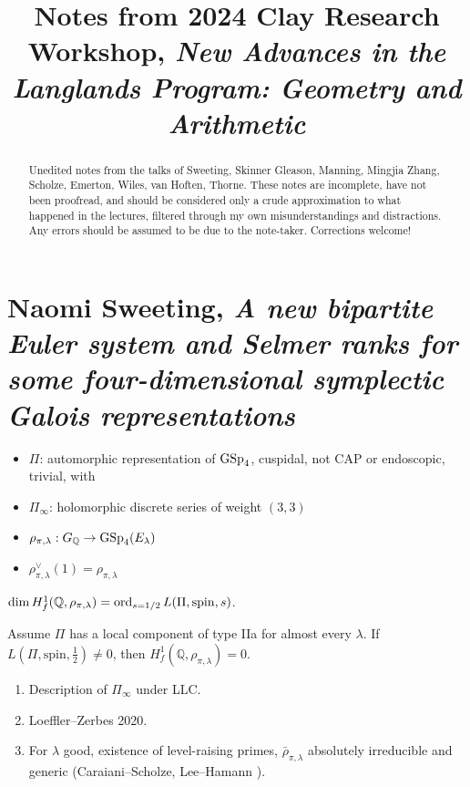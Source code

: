 \documentclass[reqno]{amsart} 
\begin{document}
\title{Notes from 2024 Clay Research Workshop, \emph{New Advances in the Langlands Program: Geometry and Arithmetic}}

\begin{abstract}
  Unedited notes from the talks of Sweeting, Skinner Gleason, Manning, Mingjia Zhang, Scholze, Emerton, Wiles, van Hoften, Thorne.  These notes are incomplete, have not been proofread, and should be considered only a crude approximation to what happened in the lectures, filtered through my own misunderstandings and distractions.  Any errors should be assumed to be due to the note-taker.  Corrections welcome!
\end{abstract}

\maketitle

\tableofcontents

\part{Naomi Sweeting, \emph{A new bipartite Euler system and Selmer ranks for some four-dimensional symplectic Galois representations}}

\begin{itemize}
\item $\Pi$: automorphic representation of $\operatorname{GSp}_{4}$, cuspidal, not CAP or endoscopic, trivial, with 
\item $\Pi_\infty$: holomorphic discrete series of weight $(3,3)$
\item $\rho_{\pi, \lambda} : G_{\mathbb{Q}} \rightarrow \operatorname{GSp}_4(E_\lambda)$
\item $\rho_{\pi, \lambda}^\vee(1) = \rho_{\pi, \lambda}$
\end{itemize}
\begin{conjecture}
  $\dim H_f^1(\mathbb{Q}, \rho_{\pi, \lambda}) = \operatorname{ord}_{s = 1/2} L(\Pi, \mathrm{spin}, s)$.
\end{conjecture}
\begin{theorem}[S.,\ TBD]\label{theorem:cnpoolw6ih}
  Assume $\Pi$ has a local component of type IIa for almost every $\lambda$.  If $L(\Pi, \mathrm{spin}, \tfrac{1}{2}) \neq 0$, then $H_f^1(\mathbb{Q}, \rho_{\pi, \lambda}) = 0$.
\end{theorem}

\begin{remark}
  \begin{enumerate}
  \item Description of $\Pi_\infty$ under LLC.
  \item Loeffler--Zerbes 2020.
  \item For $\lambda$ good, existence of level-raising primes, $\bar{\rho}_{\pi, \lambda}$ absolutely irreducible and generic (Caraiani--Scholze, Lee--Hamann \cite{2023arXiv2309.08705}).
  \end{enumerate}
\end{remark}
\end{document}
